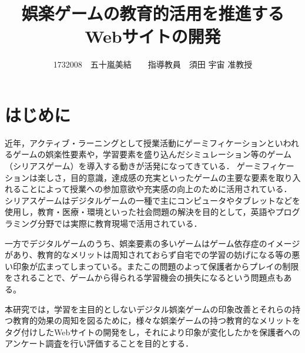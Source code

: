 \documentclass[twocolumn,10pt,a4j]{ltjsarticle}
\title{娯楽ゲームの教育的活用を推進するWebサイトの開発}
\author{1732008　五十嵐美結　　指導教員　須田 宇宙 准教授}
\date{}
\begin{document}
\maketitle

\section{はじめに}

近年，アクティブ・ラーニングとして授業活動にゲーミフィケーションといわれるゲームの娯楽性要素や，学習要素を盛り込んだシミュレーション等のゲーム（シリアスゲーム）を導入する動きが活発になってきている．
ゲーミフィケーションは楽しさ，目的意識，達成感の充実といったゲームの主要な要素を取り入れることによって授業への参加意欲や充実感の向上のために活用されている．
シリアスゲームはデジタルゲームの一種で主にコンピュータやタブレットなどを使用し，教育・医療・環境といった社会問題の解決を目的として，英語やプログラミング分野では実際に教育現場で活用されている．

一方でデジタルゲームのうち、娯楽要素の多いゲームはゲーム依存症のイメージがあり、教育的なメリットは周知されておらず自宅での学習の妨げになる等の悪い印象が広まってしまっている。またこの問題のよって保護者からプレイの制限をされることで、ゲームから得られる学習機会の損失になるという問題点もある。




本研究では，学習を主目的としないデジタル娯楽ゲームの印象改善とそれらの持つ教育的効果の周知を図るために，様々な娯楽ゲームの持つ教育的なメリットをタグ付けしたWebサイトの開発をし，それにより印象が変化したかを保護者へのアンケート調査を行い評価することを目的とする．
\end{document}
